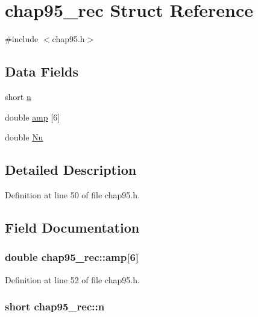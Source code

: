 \hypertarget{structchap95__rec}{\section{chap95\-\_\-rec Struct Reference}
\label{structchap95__rec}
}


{\ttfamily \#include $<$chap95.\-h$>$}

\subsection*{Data Fields}
\begin{DoxyCompactItemize}
\item 
short \hyperlink{structchap95__rec_aede2c143b0232546b6b72f5c1baea673}{n}
\item 
double \hyperlink{structchap95__rec_a6b9ff076ab6312d71d591cc708cec4df}{amp} \mbox{[}6\mbox{]}
\item 
double \hyperlink{structchap95__rec_aefec81036fd6d6df1517ead20178ddeb}{Nu}
\end{DoxyCompactItemize}


\subsection{Detailed Description}


Definition at line 50 of file chap95.\-h.



\subsection{Field Documentation}
\hypertarget{structchap95__rec_a6b9ff076ab6312d71d591cc708cec4df}{
\subsubsection[{amp}]{\setlength{\rightskip}{0pt plus 5cm}double chap95\-\_\-rec\-::amp\mbox{[}6\mbox{]}}}\label{structchap95__rec_a6b9ff076ab6312d71d591cc708cec4df}


Definition at line 52 of file chap95.\-h.

\hypertarget{structchap95__rec_aede2c143b0232546b6b72f5c1baea673}{
\subsubsection[{n}]{\setlength{\rightskip}{0pt plus 5cm}short chap95\-\_\-rec\-::n}}\label{structchap95__rec_aede2c143b0232546b6b72f5c1baea673}


